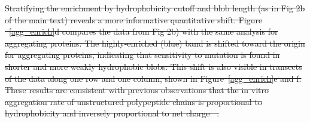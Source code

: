 \documentclass[9pt,twocolumn,twoside,lineno]{pnas-new} %
\newcommand{\dSNPs}{dSNPs~}
\providecommand{\DIFdel}[1]{{\protect\color{red}\sout{#1}}}                      %
\begin{document}
\DIFdel{Stratifying the enrichment by hydrophobicity cutoff and blob length (as in Fig 2b of the main text) reveals a more informative quantitative shift. Figure ~\ref{agg_enrich}d compares the data from Fig 2b) with the same analysis for aggregating proteins. The highly-enriched (blue) band is shifted toward the origin for aggregating proteins, indicating that sensitivity to mutation is found in shorter and more weakly hydrophobic blobs. %
This shift is also visible in transects of the data along one row and one column, shown in Figure~\ref{agg_enrich}e and f. %
These results are consistent with previous observations that the in vitro aggregation rate of unstructured polypeptide chains is proportional to hydrophobicity and inversely proportional to net charge\mbox{%
\citep{DuBay2004}}\hspace{0pt}%
.   %
}%

\end{document}
